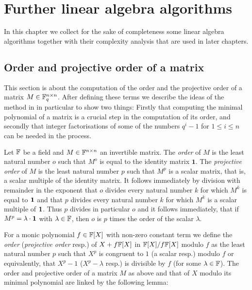 
\chapter{Further linear algebra algorithms}

In this chapter we collect for the sake of completeness some
linear algebra algorithms together with their complexity analysis
that are used in later chapters. 

\section{Order and projective order of a matrix}
\label{sec:orders}

This section is about the computation of the order and the projective
order of a matrix $M \in \mathbb{F}_q^{n \times n}$. After defining these 
terms we describe the 
ideas of the method in \cite{CellLeedOrder} in particular to show
two things: Firstly that computing the minimal polynomial of a matrix
is a crucial step in the computation of its order, and secondly that
integer factorisations of some of the numbers $q^i-1$ for $1 \le i \le n$ 
can be needed in the process.

\begin{DefProp}
Let $\mathbb{F}$ be a field and $M \in \mathbb{F}^{n \times
n}$ an invertible matrix. The \emph{order} of $M$ is the least natural
number $o$ such that $M^o$ is equal to the identity matrix $\mathbf{1}$.
The \emph{projective order} of $M$ is the least natural number $p$
such that $M^p$ is a scalar matrix, that is, a scalar multiple of the
identity matrix. It follows immediately by division with remainder in
the exponent that $o$ divides every natural number $k$ for which 
$M^k$ is equal to $\mathbf{1}$ and that $p$ divides every natural number $k$
for which $M^k$ is a scalar multiple of $\mathbf{1}$. Thus $p$ divides in
particular $o$ and it follows immediately, that if $M^p = \lambda \cdot
\mathbf{1}$ with $\lambda \in \mathbb{F}$, then $o$ is $p$ times the order of the
scalar $\lambda$. \proofend
\end{DefProp}

For a monic polynomial $f \in \mathbb{F}[X]$ with non-zero constant term
we define the \emph{order} (\emph{projective order} resp.) of 
$X + f\mathbb{F}[X]$ in $\mathbb{F}[X]/f\mathbb{F}[X]$ modulo $f$ as the least natural 
number $p$ such that $X^p$ is congruent 
to $1$ (a scalar resp.) modulo $f$ or equivalently, that $X^p-1$ 
($X^p-\lambda$ resp.) is
divisible by $f$ (for some $\lambda \in \mathbb{F}$). 
The order and projective order
of a matrix $M$ as above and that of $X$ modulo its minimal polynomial are 
linked by the following lemma:

